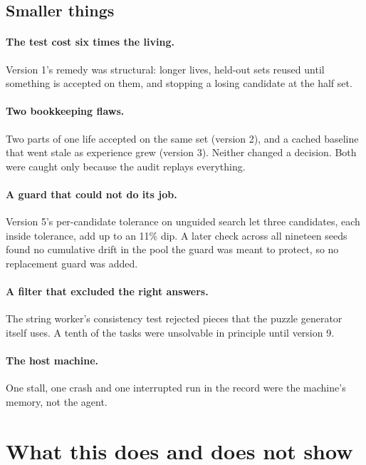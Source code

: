 \documentclass[11pt]{article}
\begin{document}
\subsection{Smaller things}

\paragraph{The test cost six times the living.} Version 1's remedy was structural: longer lives, held-out sets reused until something is accepted on them, and stopping a losing candidate at the half set.

\paragraph{Two bookkeeping flaws.} Two parts of one life accepted on the same set (version 2), and a cached baseline that went stale as experience grew (version 3). Neither changed a decision. Both were caught only because the audit replays everything.

\paragraph{A guard that could not do its job.} Version 5's per-candidate tolerance on unguided search let three candidates, each inside tolerance, add up to an 11\% dip. A later check across all nineteen seeds found no cumulative drift in the pool the guard was meant to protect, so no replacement guard was added.

\paragraph{A filter that excluded the right answers.} The string worker's consistency test rejected pieces that the puzzle generator itself uses. A tenth of the tasks were unsolvable in principle until version 9.

\paragraph{The host machine.} One stall, one crash and one interrupted run in the record were the machine's memory, not the agent.

\section{What this does and does not show}
\label{sec:shows}
\end{document}
